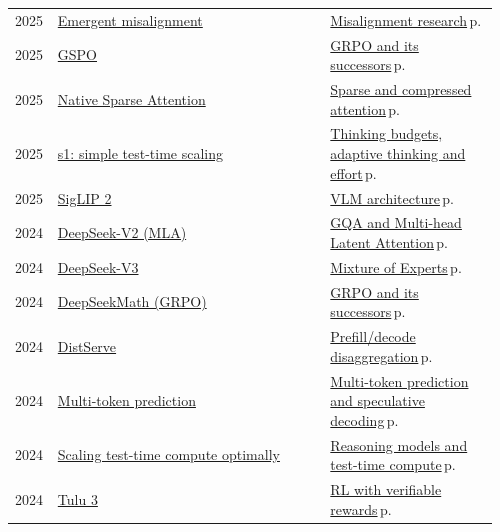 \documentclass[10pt,a4paper,openany]{report}
\begin{document}
{\begin{longtable}{@{}p{0.07\linewidth}>{\raggedright}p{0.55\linewidth}>{\raggedright\arraybackslash}p{0.34\linewidth}@{}}
2025 & \href{https://arxiv.org/abs/2502.17424}{Emergent misalignment} & \hyperref[c:safety-9]{Misalignment research}\,{\color{muted}\scriptsize p.\,\pageref{c:safety-9}}\\
2025 & \href{https://arxiv.org/abs/2507.18071}{GSPO} & \hyperref[c:reasoning-4]{GRPO and its successors}\,{\color{muted}\scriptsize p.\,\pageref{c:reasoning-4}}\\
2025 & \href{https://arxiv.org/abs/2502.11089}{Native Sparse Attention} & \hyperref[c:arch-2]{Sparse and compressed attention}\,{\color{muted}\scriptsize p.\,\pageref{c:arch-2}}\\
2025 & \href{https://arxiv.org/abs/2501.19393}{s1: simple test-time scaling} & \hyperref[c:reasoning-1]{Thinking budgets, adaptive thinking and effort}\,{\color{muted}\scriptsize p.\,\pageref{c:reasoning-1}}\\
2025 & \href{https://arxiv.org/abs/2502.14786}{SigLIP 2} & \hyperref[c:vlm-0]{VLM architecture}\,{\color{muted}\scriptsize p.\,\pageref{c:vlm-0}}\\
2024 & \href{https://arxiv.org/abs/2405.04434}{DeepSeek-V2 (MLA)} & \hyperref[c:arch-1]{GQA and Multi-head Latent Attention}\,{\color{muted}\scriptsize p.\,\pageref{c:arch-1}}\\
2024 & \href{https://arxiv.org/abs/2412.19437}{DeepSeek-V3} & \hyperref[c:arch-0]{Mixture of Experts}\,{\color{muted}\scriptsize p.\,\pageref{c:arch-0}}\\
2024 & \href{https://arxiv.org/abs/2402.03300}{DeepSeekMath (GRPO)} & \hyperref[c:reasoning-4]{GRPO and its successors}\,{\color{muted}\scriptsize p.\,\pageref{c:reasoning-4}}\\
2024 & \href{https://arxiv.org/abs/2401.09670}{DistServe} & \hyperref[c:inference-3]{Prefill/decode disaggregation}\,{\color{muted}\scriptsize p.\,\pageref{c:inference-3}}\\
2024 & \href{https://arxiv.org/abs/2404.19737}{Multi-token prediction} & \hyperref[c:arch-6]{Multi-token prediction and speculative decoding}\,{\color{muted}\scriptsize p.\,\pageref{c:arch-6}}\\
2024 & \href{https://arxiv.org/abs/2408.03314}{Scaling test-time compute optimally} & \hyperref[c:reasoning-0]{Reasoning models and test-time compute}\,{\color{muted}\scriptsize p.\,\pageref{c:reasoning-0}}\\
2024 & \href{https://arxiv.org/abs/2411.15124}{Tulu 3} & \hyperref[c:reasoning-2]{RL with verifiable rewards}\,{\color{muted}\scriptsize p.\,\pageref{c:reasoning-2}}\\

\end{longtable}}
\end{document}
